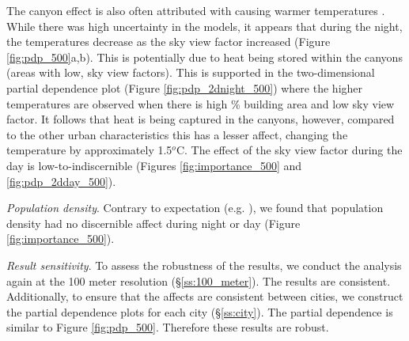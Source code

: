 \documentclass[final,3p,times,twocolumn,sort&compress]{elsarticle}
\begin{document}
The canyon effect is also often attributed with causing warmer temperatures \cite{Chun2017-mm,Oke1988-re}.
While there was high uncertainty in the models, it appears that during the night, the temperatures decrease as the sky view factor increased (Figure \ref{fig:pdp_500}a,b).
This is potentially due to heat being stored within the canyons (areas with low, sky view factors).
This is supported in the two-dimensional partial dependence plot (Figure \ref{fig:pdp_2dnight_500}) where the higher temperatures are observed when there is high \% building area and low sky view factor.
It follows that heat is being captured in the canyons, however, compared to the other urban characteristics this has a lesser affect, changing the temperature by approximately 1.5$^o$C.
The effect of the sky view factor during the day is low-to-indiscernible (Figures \ref{fig:importance_500} and \ref{fig:pdp_2dday_500}).

\textit{Population density}.
Contrary to expectation (e.g. \cite{Peng2012-iy}), we found that population density had no discernible affect during night or day (Figure \ref{fig:importance_500}).

\textit{Result sensitivity}.
To assess the robustness of the results, we conduct the analysis again at the 100 meter resolution (\S \ref{ss:100_meter}).
The results are consistent.
Additionally, to ensure that the affects are consistent between cities, we construct the partial dependence plots for each city (\S \ref{ss:city}).
The partial dependence is similar to Figure \ref{fig:pdp_500}.
Therefore these results are robust.
\end{document}
